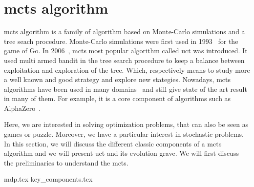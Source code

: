 \section{\acrlong{mcts} algorithm}%
\label{sec:mcts_algorithm}

\gls{mcts} algorithm is a family of algorithm based on Monte-Carlo simulations and a tree seach procedure.
Monte-Carlo simulations were first used in 1993~\cite{mcgo} for the game of Go.
In 2006~\cite{uct}, \gls{mcts} most popular algorithm called \gls{uct} was introduced.
It used multi armed bandit in the tree search procedure to keep a balance between exploitation and exploration of the tree.
Which, respectively means to study more a well known and good strategy and explore new stategies.
Nowadays, \gls{mcts} algorithms have been used in many domains~\cite{survey_mcts} and still give state of the art result in many of them.
For example, it is a core component of algorithms such as AlphaZero~\cite{alphazero}.

Here, we are interested in solving optimization problems, that can also be seen as games or puzzle.
Moreover, we have a particular interest in stochastic problems.
In this section, we will discuss the different classic components of a \gls{mcts} algorithm and we will present \gls{uct} and its evolution \gls{grave}.
We will first discuss the preliminaries to understand the \gls{mcts}.

{mdp.tex}
{key_components.tex}

